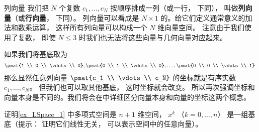 
\begin{exercise}{列向量}
我们把 $N$ 个复数 $c_1, \dots, c_N$ 按顺序排成一列（或一行， 下同）， 叫做\textbf{列向量}（或\textbf{行向量}， 下同）。 列向量可以看成是 $N \times 1$ 的。给它们定义通常意义的加法和数乘运算， 这样所有列向量可以构成一个 $N$ 维向量空间。 注意由于我们使用了复数， 即使 $N \leqslant 3$ 时我们也无法将这些向量与几何向量对应起来。

如果我们将基底取为
$$
\pmat{1 \\ 0 \\ \vdots \\ 0}, \pmat{0 \\ 1 \\ \vdots \\ 0}, \dots, \pmat{0 \\ 0 \\ \vdots \\ 1}~
$$
那么显然任意列向量 $\pmat{c_1 \\ \vdots \\ c_N}$ 的坐标就是有序实数 $c_1, \dots, c_N$。 但我们也可以取其他基底， 这时坐标就会改变。 所以再次强调坐标和向量本身是不同的。我们将会在中详细区分向量本身和向量的坐标这两个概念。
\end{exercise}

\begin{exercise}{}
证明\autoref{ex_LSpace_1} 中多项式空间是 $n+1$ 维空间， $x^k$ （$k = 0, \dots, n$） 是一组基底（提示： 证明它们线性无关， 可以表示空间中的任意向量）。
\end{exercise}





